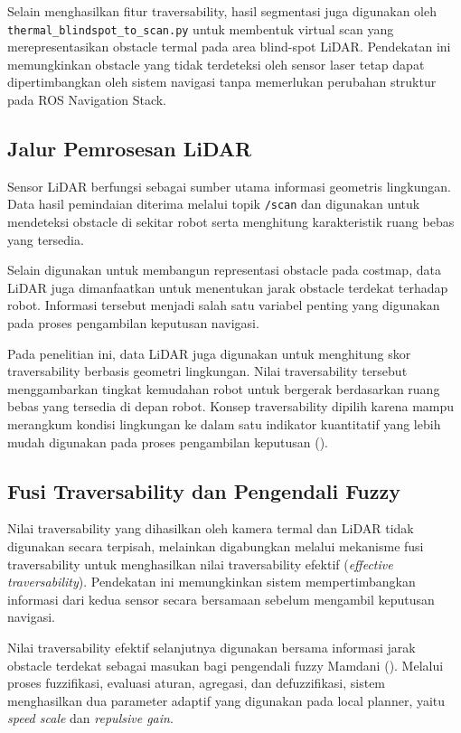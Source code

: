 Selain menghasilkan fitur traversability, hasil segmentasi juga digunakan oleh \texttt{thermal\-\_blindspot\_to\_scan.py} untuk membentuk virtual scan yang merepresentasikan obstacle termal pada area blind-spot LiDAR. Pendekatan ini memungkinkan obstacle yang tidak terdeteksi oleh sensor laser tetap dapat dipertimbangkan oleh sistem navigasi tanpa memerlukan perubahan struktur pada ROS Navigation Stack.

\subsection{Jalur Pemrosesan LiDAR}

Sensor LiDAR berfungsi sebagai sumber utama informasi geometris lingkungan. Data hasil pemindaian diterima melalui topik \texttt{/scan} dan digunakan untuk mendeteksi obstacle di sekitar robot serta menghitung karakteristik ruang bebas yang tersedia.

Selain digunakan untuk membangun representasi obstacle pada costmap, data LiDAR juga dimanfaatkan untuk menentukan jarak obstacle terdekat terhadap robot. Informasi tersebut menjadi salah satu variabel penting yang digunakan pada proses pengambilan keputusan navigasi.

Pada penelitian ini, data LiDAR juga digunakan untuk menghitung skor traversability berbasis geometri lingkungan. Nilai traversability tersebut menggambarkan tingkat kemudahan robot untuk bergerak berdasarkan ruang bebas yang tersedia di depan robot. Konsep traversability dipilih karena mampu merangkum kondisi lingkungan ke dalam satu indikator kuantitatif yang lebih mudah digunakan pada proses pengambilan keputusan (\cite{Sevastopoulos2022}).

\subsection{Fusi Traversability dan Pengendali Fuzzy}

Nilai traversability yang dihasilkan oleh kamera termal dan LiDAR tidak digunakan secara terpisah, melainkan digabungkan melalui mekanisme fusi traversability untuk menghasilkan nilai traversability efektif (\textit{effective traversability}). Pendekatan ini memungkinkan sistem mempertimbangkan informasi dari kedua sensor secara bersamaan sebelum mengambil keputusan navigasi.

Nilai traversability efektif selanjutnya digunakan bersama informasi jarak obstacle terdekat sebagai masukan bagi pengendali fuzzy Mamdani (\cite{Mamdani1974}). Melalui proses fuzzifikasi, evaluasi aturan, agregasi, dan defuzzifikasi, sistem menghasilkan dua parameter adaptif yang digunakan pada local planner, yaitu \textit{speed scale} dan \textit{repulsive gain}.

